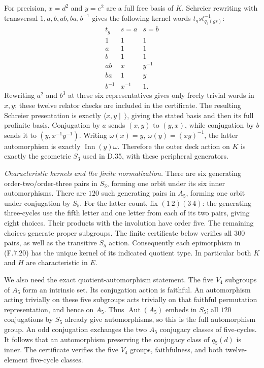 For precision, $x=d^2$ and $y=e^2$ are a full free basis
of $K$.  Schreier rewriting with transversal
$1,a,b,ab,ba,b^{-1}$ gives the following kernel words
$t_g s t_{q_3(gs)}^{-1}$:
\[
 \begin{array}{c|cc}
 t_g&s=a&s=b\\ \hline
 1&1&1\\ a&1&1\\ b&1&1\\
 ab&x&y^{-1}\\ ba&1&y\\ b^{-1}&x^{-1}&1 .
 \end{array}                                             \tag{F.7.22}
\]
Rewriting $a^2$ and $b^3$ at these six representatives
gives only freely trivial words in $x,y$; these twelve
relator checks are included in the certificate.
The resulting Schreier presentation is exactly
$\langle x,y\mid\ \rangle$, giving the stated basis
and then its full profinite basis.  Conjugation by $a$ sends
$(x,y)$ to $(y,x)$, while conjugation by $b$ sends it
to $(y,x^{-1}y^{-1})$.  Writing
$\omega(x)=y$, $\omega(y)=(xy)^{-1}$, the latter
automorphism is exactly $\operatorname{Inn}(y)\omega$.
Therefore the outer
deck action on $K$ is exactly the geometric $S_3$
used in D.35, with these peripheral generators.

\emph{Characteristic kernels and the finite normalization.}
There are six generating order-two/order-three pairs in
$S_3$, forming one orbit under its six inner automorphisms.
There are $120$ such generating pairs in $A_5$, forming
one orbit under conjugation by $S_5$.
For the latter count, fix $(1\ 2)(3\ 4)$: the generating
three-cycles use the fifth letter and one letter from
each of its two pairs, giving eight choices.
Their products with the involution have order five.
The remaining choices generate proper subgroups.
The finite certificate below verifies all $300$ pairs,
as well as the transitive $S_5$ action.
Consequently each epimorphism in (F.7.20) has the unique
kernel of its indicated quotient type.  In particular
both $K$ and $H$ are characteristic in $E$.

We also need the exact quotient-automorphism statement.
The five $V_4$ subgroups of $A_5$ form an intrinsic set.
Its conjugation action is faithful.  An automorphism
acting trivially on these five subgroups acts trivially
on that faithful permutation representation, and hence
on $A_5$.  Thus $\operatorname{Aut}(A_5)$ embeds in $S_5$;
all $120$ conjugations by $S_5$ already give automorphisms,
so this is the full automorphism group.  An odd
conjugation exchanges the two $A_5$ conjugacy classes
of five-cycles.  It follows that an automorphism
preserving the conjugacy class of $q_5(d)$ is inner.
The certificate verifies the five $V_4$ groups,
faithfulness, and both twelve-element five-cycle classes.


